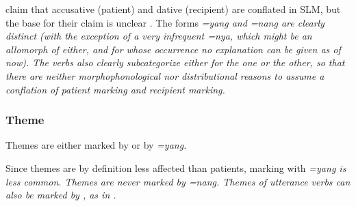 
\citet{SmithEtAl2004} claim that accusative (patient) and dative (recipient) are conflated in SLM, but the base for their claim is unclear \citep{Ansaldo2005ms}. The forms \em =yang \em and \em =nang \em are clearly distinct (with the exception of a very infrequent \em =nya\em, which might be an allomorph of either, and for whose occurrence no explanation can be given as of now). The verbs also clearly subcategorize either for the one or the other, so that there are neither morphophonological nor distributional reasons to assume a conflation of patient marking and recipient marking.

\subsubsection{Theme}\label{sec:func:Theme}
Themes are either marked by \zero{} or by \em =yang\em.



Since themes are by definition less affected than patients, marking with \em =yang \em is less common. Themes are never marked by \em =nang\em.
Themes of  utterance verbs can also be marked by , as in .


